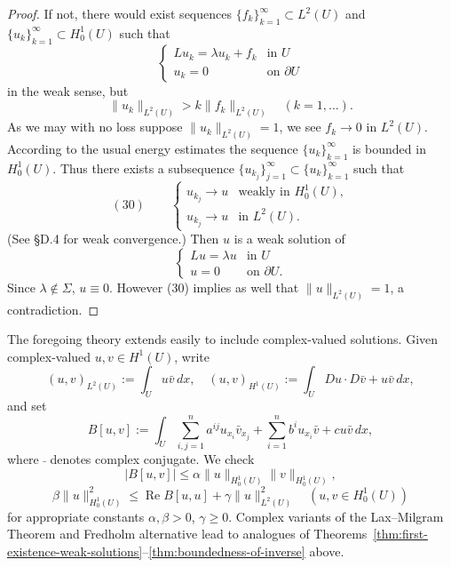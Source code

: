 \begin{proof}
If not, there would exist sequences $\{f_k\}_{k=1}^\infty \subset L^2(U)$ and $\{u_k\}_{k=1}^\infty \subset H_0^1(U)$ such that
$$\begin{cases} Lu_k = \lambda u_k + f_k & \text{in } U \\ u_k = 0 & \text{on } \partial U \end{cases}$$
in the weak sense, but
$$\|u_k\|_{L^2(U)} > k\|f_k\|_{L^2(U)} \quad (k=1,\ldots).$$
As we may with no loss suppose $\|u_k\|_{L^2(U)} = 1$, we see $f_k \to 0$ in $L^2(U)$. According to the usual energy estimates the sequence $\{u_k\}_{k=1}^\infty$ is bounded in $H_0^1(U)$. Thus there exists a subsequence $\{u_{k_j}\}_{j=1}^\infty \subset \{u_k\}_{k=1}^\infty$ such that
$$(30) \qquad \begin{cases} u_{k_j} \to u & \text{weakly in } H_0^1(U), \\ u_{k_j} \to u & \text{in } L^2(U). \end{cases}$$
(See \S D.4 for weak convergence.) Then $u$ is a weak solution of
$$\begin{cases} Lu = \lambda u & \text{in } U \\ u = 0 & \text{on } \partial U. \end{cases}$$
Since $\lambda \notin \Sigma$, $u \equiv 0$. However (30) implies as well that $\|u\|_{L^2(U)} = 1$, a contradiction.
\end{proof}

\begin{remark}
\label{rem:complex-valued-weak-solutions}
The foregoing theory extends easily to include complex-valued solutions. Given complex-valued $u,v \in H^1(U)$, write
$$(u,v)_{L^2(U)} := \int_U u\bar v\,dx, \quad (u,v)_{H^1(U)} := \int_U Du \cdot D\bar v + u\bar v\,dx,$$
and set
$$B[u,v] := \int_U \sum_{i,j=1}^n a^{ij}u_{x_i}\bar v_{x_j} + \sum_{i=1}^n b^iu_{x_i}\bar v + cu\bar v\,dx,$$
where $\bar{\ }$ denotes complex conjugate. We check
$$|B[u,v]| \leq \alpha\|u\|_{H_0^1(U)}\|v\|_{H_0^1(U)},$$
$$\beta\|u\|_{H_0^1(U)}^2 \leq \operatorname{Re}B[u,u] + \gamma\|u\|_{L^2(U)}^2 \quad (u,v \in H_0^1(U))$$
for appropriate constants $\alpha,\beta > 0$, $\gamma \geq 0$. Complex variants of the Lax--Milgram Theorem and Fredholm alternative lead to analogues of Theorems~\ref{thm:first-existence-weak-solutions}--\ref{thm:boundedness-of-inverse} above.
\end{remark}

